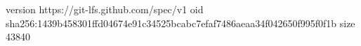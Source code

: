 version https://git-lfs.github.com/spec/v1
oid sha256:1439b458301ffd04674e91c34525bcabc7efaf7486aeaa34f042650f995f0f1b
size 43840
